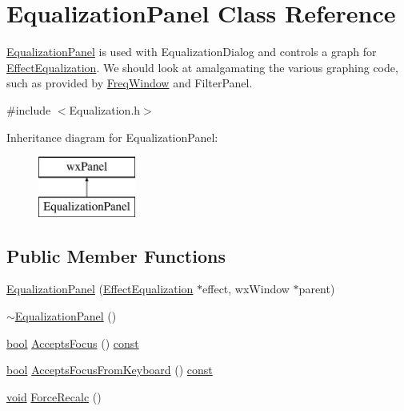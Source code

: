 \hypertarget{class_equalization_panel}{}\section{Equalization\+Panel Class Reference}
\label{class_equalization_panel}


\hyperlink{class_equalization_panel}{Equalization\+Panel} is used with Equalization\+Dialog and controls a graph for \hyperlink{class_effect_equalization}{Effect\+Equalization}. We should look at amalgamating the various graphing code, such as provided by \hyperlink{class_freq_window}{Freq\+Window} and Filter\+Panel.  




{\ttfamily \#include $<$Equalization.\+h$>$}

Inheritance diagram for Equalization\+Panel\+:\begin{figure}[H]
\begin{center}
\leavevmode
\includegraphics[height=2.000000cm]{class_equalization_panel}
\end{center}
\end{figure}
\subsection*{Public Member Functions}
\begin{DoxyCompactItemize}
\item 
\hyperlink{class_equalization_panel_a3eb73ccb04f015d80c9256a2ddbb34ef}{Equalization\+Panel} (\hyperlink{class_effect_equalization}{Effect\+Equalization} $\ast$effect, wx\+Window $\ast$parent)
\item 
\hyperlink{class_equalization_panel_af197c7ba08a4aaca9732009491a55bba}{$\sim$\+Equalization\+Panel} ()
\item 
\hyperlink{mac_2config_2i386_2lib-src_2libsoxr_2soxr-config_8h_abb452686968e48b67397da5f97445f5b}{bool} \hyperlink{class_equalization_panel_ac0a2fd8a962bf39178f2eb417e6cd979}{Accepts\+Focus} () \hyperlink{getopt1_8c_a2c212835823e3c54a8ab6d95c652660e}{const} 
\item 
\hyperlink{mac_2config_2i386_2lib-src_2libsoxr_2soxr-config_8h_abb452686968e48b67397da5f97445f5b}{bool} \hyperlink{class_equalization_panel_a0a12f3a39e11f426b3d8cd949c0e374b}{Accepts\+Focus\+From\+Keyboard} () \hyperlink{getopt1_8c_a2c212835823e3c54a8ab6d95c652660e}{const} 
\item 
\hyperlink{sound_8c_ae35f5844602719cf66324f4de2a658b3}{void} \hyperlink{class_equalization_panel_ac6c15ac3c6557e532345999e64c541f9}{Force\+Recalc} ()
\end{DoxyCompactItemize}


